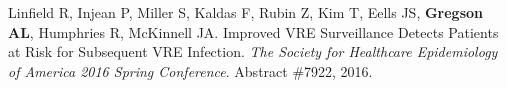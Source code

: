 \documentclass[letterpaper,11pt,sans,final]{moderncv}%
\begin{document}
\begin{thebibliography}{1}
\bibitem[17]{} Linfield R, Injean P, Miller S, Kaldas F, Rubin Z, Kim T, Eells JS, \textbf{Gregson AL}, Humphries R, McKinnell JA. Improved VRE Surveillance Detects Patients at Risk for Subsequent VRE Infection. \textit{The Society for Healthcare Epidemiology of America 2016 Spring Conference}. Abstract \#7922, 2016.


\end{thebibliography}
\end{document}
